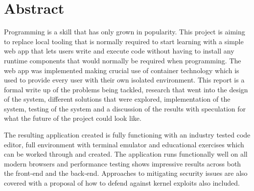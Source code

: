 \section{Abstract}


Programming is a skill that has only grown in popularity. This project is aiming to replace local tooling that is normally required to start learning with a simple web app that lets users write and execute code without having to install any runtime components that would normally be required when programming. The web app was implemented making crucial use of container technology which is used to provide every user with their own isolated environment. This report is a formal write up of the problems being tackled, research that went into the design of the system, different solutions that were explored, implementation of the system, testing of the system and a discussion of the results with speculation for what the future of the project could look like. 

The resulting application created is fully functioning with an industry tested code editor, full environment with terminal emulator and educational exercises which can be worked through and created. The application runs functionally well on all modern browsers and performance testing shows impressive results across both the front-end and the back-end. Approaches to mitigating security issues are also covered with a proposal of how to defend against kernel exploits also included.
\pagebreak


